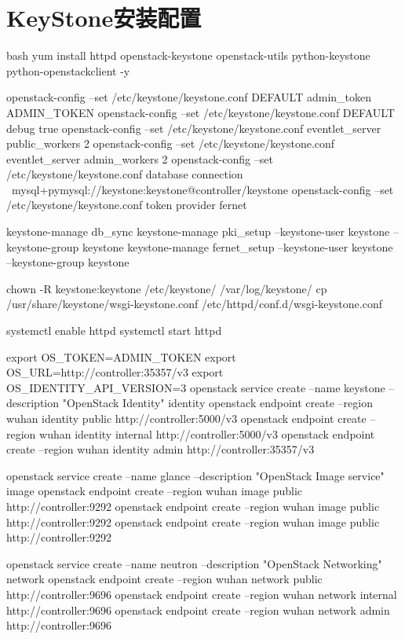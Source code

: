 \section{KeyStone安装配置}
\begin{code-block}{bash}
yum install httpd openstack-keystone openstack-utils python-keystone python-openstackclient -y

openstack-config --set /etc/keystone/keystone.conf DEFAULT admin_token ADMIN_TOKEN
openstack-config --set /etc/keystone/keystone.conf DEFAULT debug true
openstack-config --set /etc/keystone/keystone.conf eventlet_server public_workers 2
openstack-config --set /etc/keystone/keystone.conf eventlet_server admin_workers 2
openstack-config --set /etc/keystone/keystone.conf database connection \
    mysql+pymysql://keystone:keystone@controller/keystone
openstack-config --set /etc/keystone/keystone.conf token provider fernet

keystone-manage db_sync
keystone-manage pki_setup --keystone-user keystone --keystone-group keystone
keystone-manage fernet_setup --keystone-user keystone --keystone-group keystone

chown -R keystone:keystone /etc/keystone/ /var/log/keystone/
cp /usr/share/keystone/wsgi-keystone.conf /etc/httpd/conf.d/wsgi-keystone.conf

systemctl enable httpd
systemctl start httpd

export OS_TOKEN=ADMIN_TOKEN
export OS_URL=http://controller:35357/v3
export OS_IDENTITY_API_VERSION=3
openstack service create --name keystone --description "OpenStack Identity" identity
openstack endpoint create --region wuhan identity public http://controller:5000/v3
openstack endpoint create --region wuhan identity internal http://controller:5000/v3
openstack endpoint create --region wuhan identity admin http://controller:35357/v3

openstack service create --name glance --description "OpenStack Image service" image
openstack endpoint create --region wuhan  image public http://controller:9292
openstack endpoint create --region wuhan  image public http://controller:9292
openstack endpoint create --region wuhan  image public http://controller:9292

openstack service create --name neutron  --description "OpenStack Networking" network
openstack endpoint create --region wuhan network public http://controller:9696
openstack endpoint create --region wuhan network internal http://controller:9696
openstack endpoint create --region wuhan network admin http://controller:9696


\end{code-block}
